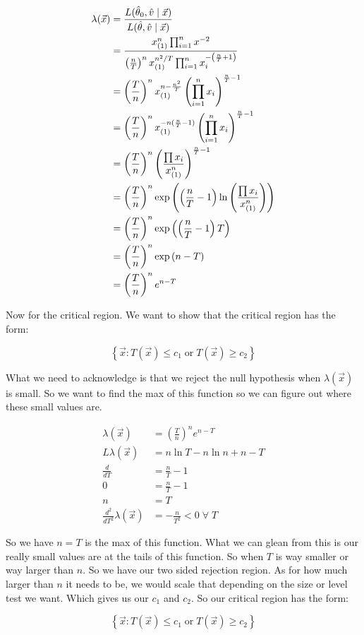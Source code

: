\begin{align*}
	\lambda(\vec{x}) &= \frac{L(\hat{\theta}_0, \hat{v} \mid \vec{x})}{L(\hat{\theta}, \hat{v} \mid \vec{x})} \\
	&= \frac{x_{(1)}^n \prod_{i=1}^n x^{-2}}
	{\left( \frac{n}{T} \right)^n x_{(1)}^{n^2/T} \prod_{i=1}^n x_i^{-\left( \frac{n}{T} + 1 \right)}} \\
	&= \left( \frac{T}{n} \right)^n x_{(1)}^{n - \frac{n^2}{T}} \left( \prod_{i=1}^n x_i \right)^{\frac{n}{T} - 1} \\
	&= \left( \frac{T}{n} \right)^n x_{(1)}^{-n(\frac{n}{T} - 1)} \left( \prod_{i=1}^n x_i \right)^{\frac{n}{T} - 1} \\
	&= \left( \frac{T}{n} \right)^n \left(  \frac{\prod x_i}{x_{(1)}^n} \right)^{\frac{n}{T} - 1} \\
	&= \left( \frac{T}{n} \right)^n \exp\left( \left( \frac{n}{T} - 1 \right) \ln \left(  \frac{\prod x_i}{x_{(1)}^n} \right) \right) \\
	&= \left( \frac{T}{n} \right)^n  \exp\left( \left( \frac{n}{T} - 1 \right) T\right) \\
	&= \left( \frac{T}{n} \right)^n  \exp\left( n - T \right) \\
	&= \left( \frac{T}{n} \right)^n e^{n - T}
\end{align*}

Now for the critical region. We want to show that the critical region has the form:

\[
	\left\{ \vec{x}: T(\vec{x}) \leq c_1 \; \text{or} \; T(\vec{x}) \geq c_2 \right\}
\]

What we need to acknowledge is that we reject the null hypothesis when $\lambda(\vec{x})$ is small. So we want to find the max of this function so we can figure out where these small values are.

\begin{align*}
	\lambda(\vec{x}) &= \left( \frac{T}{n} \right)^n e^{n - T} \\
	L\lambda(\vec{x}) &= n\ln T - n\ln n + n - T \\
	\frac{d}{dT} &= \frac{n}{T} - 1 \\
	0 &= \frac{n}{T} - 1 \\
	n &= T \\
	\frac{d^2}{dT^2} \lambda(\vec{x}) &= -\frac{n}{T^2} < 0 \; \forall \; T 
\end{align*}

So we have $n=T$ is the max of this function. What we can glean from this is our really small values are at the tails of this function. So when $T$ is way smaller or way larger than $n$. So we have our two sided rejection region. As for how much larger than $n$ it needs to be, we would scale that depending on the size or level test we want. Which gives us our $c_1$ and $c_2$. So our critical region has the form:

\[
	\left\{ \vec{x}: T(\vec{x}) \leq c_1 \; \text{or} \; T(\vec{x}) \geq c_2 \right\}
\]

